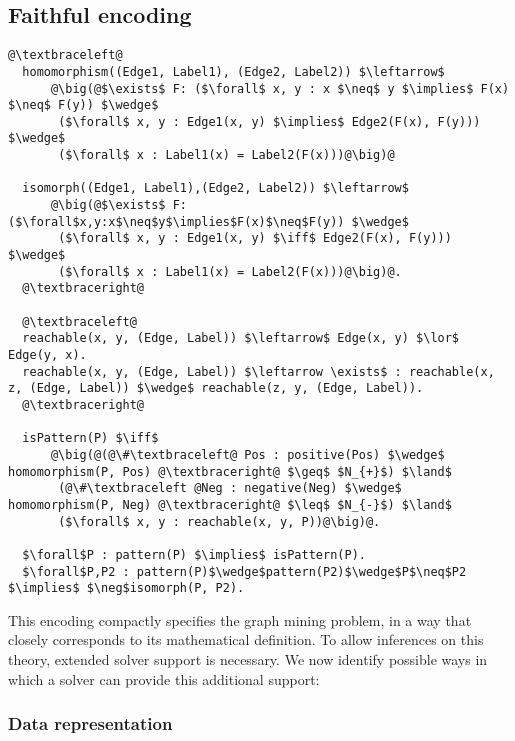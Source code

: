 \subsection{Faithful encoding}
\begin{lstlisting}[mathescape,style=model,caption={Faithfull encoding}]
  @\textbraceleft@
  homomorphism((Edge1, Label1), (Edge2, Label2)) $\leftarrow$
      @\big(@$\exists$ F: ($\forall$ x, y : x $\neq$ y $\implies$ F(x) $\neq$ F(y)) $\wedge$
       ($\forall$ x, y : Edge1(x, y) $\implies$ Edge2(F(x), F(y))) $\wedge$
       ($\forall$ x : Label1(x) = Label2(F(x)))@\big)@

  isomorph((Edge1, Label1),(Edge2, Label2)) $\leftarrow$
      @\big(@$\exists$ F: ($\forall$x,y:x$\neq$y$\implies$F(x)$\neq$F(y)) $\wedge$
       ($\forall$ x, y : Edge1(x, y) $\iff$ Edge2(F(x), F(y))) $\wedge$
       ($\forall$ x : Label1(x) = Label2(F(x)))@\big)@.
  @\textbraceright@

  @\textbraceleft@
  reachable(x, y, (Edge, Label)) $\leftarrow$ Edge(x, y) $\lor$ Edge(y, x).
  reachable(x, y, (Edge, Label)) $\leftarrow \exists$ : reachable(x, z, (Edge, Label)) $\wedge$ reachable(z, y, (Edge, Label)).
  @\textbraceright@
  
  isPattern(P) $\iff$
      @\big(@(@\#\textbraceleft@ Pos : positive(Pos) $\wedge$ homomorphism(P, Pos) @\textbraceright@ $\geq$ $N_{+}$) $\land$
       (@\#\textbraceleft @Neg : negative(Neg) $\wedge$ homomorphism(P, Neg) @\textbraceright@ $\leq$ $N_{-}$) $\land$
       ($\forall$ x, y : reachable(x, y, P))@\big)@.
      
  $\forall$P : pattern(P) $\implies$ isPattern(P). 
  $\forall$P,P2 : pattern(P)$\wedge$pattern(P2)$\wedge$P$\neq$P2 $\implies$ $\neg$isomorph(P, P2).

\end{lstlisting}


This encoding compactly specifies the graph mining problem, in a way that closely corresponds to its mathematical definition.
To allow inferences on this theory, extended solver support is necessary.
We now identify possible ways in which a solver can provide this additional support:

\subsubsection{Data representation}

